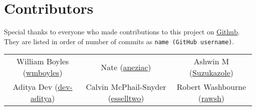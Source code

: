 \section{Contributors}
Special thanks to everyone who made contributions to this project on \href{https://github.com/wmboyles/Math-Summaries}{Github}.
They are listed in order of number of commits as \texttt{name (GitHub username)}.

\begin{center}
    \begin{tabular}{ c c c }
    	William Boyles (\href{https://api.github.com/users/wmboyles}{wmboyles}) & Nate (\href{https://api.github.com/users/aneziac}{aneziac}) & Ashwin M  (\href{https://api.github.com/users/Suzukazole}{Suzukazole}) \\
		Aditya Dev (\href{https://api.github.com/users/dev-aditya}{dev-aditya}) & Calvin McPhail-Snyder (\href{https://api.github.com/users/esselltwo}{esselltwo}) & Robert Washbourne (\href{https://api.github.com/users/rawsh}{rawsh}) \\
	\end{tabular}
\end{center}
